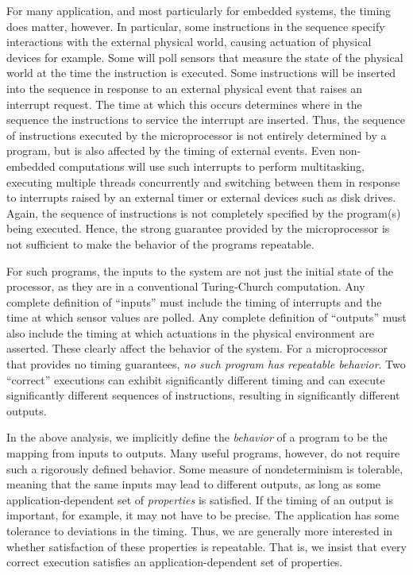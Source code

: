 For many application, and most particularly for embedded systems,
the timing does matter, however. In particular, some
instructions in the sequence specify interactions with the external
physical world, causing actuation of physical devices for example.
Some will poll sensors that measure the state of the physical world
at the time the instruction is executed. Some instructions will
be inserted into the sequence in response to an external physical
event that raises an interrupt request. The time at which this occurs
determines where in the sequence the instructions to service
the interrupt are inserted. Thus, the sequence of instructions executed
by the microprocessor is not entirely determined by a program, but
is also affected by the timing of external events.
Even non-embedded computations
will use such interrupts to perform multitasking, executing multiple
threads concurrently and switching between them in response
to interrupts raised by an external timer or external devices
such as disk drives. Again, the sequence of
instructions is not completely specified by the program(s) being
executed. Hence, the strong guarantee provided by the microprocessor
is not sufficient to make the behavior of the programs repeatable.

For such programs, the inputs to the system are not just
the initial state of the processor, as they are in a conventional Turing-Church
computation. Any complete definition of ``inputs'' must include the
timing of interrupts and the time at which sensor values are polled.
Any complete definition of ``outputs'' must also include the timing
at which actuations in the physical environment are asserted.
These clearly affect the behavior of the system.
For a microprocessor that provides no timing guarantees,
\emph{no such program has repeatable behavior}.
Two ``correct'' executions can exhibit significantly different timing
and can execute significantly different sequences of instructions,
resulting in significantly different outputs.

In the above analysis, we implicitly define the \emph{behavior}
of a program to be the mapping from inputs to outputs.
Many useful programs, however, do not require such a rigorously
defined behavior. Some measure of nondeterminism is tolerable,
meaning that the same inputs may lead to different outputs,
as long as some application-dependent set of \emph{properties} is
satisfied. If the timing of an output is important, for example,
it may not have to be precise. The application has some
tolerance to deviations in the timing. Thus, we are generally
more interested in whether satisfaction of these properties
is repeatable. That is, we insist that every correct execution
satisfies an application-dependent set of properties.

